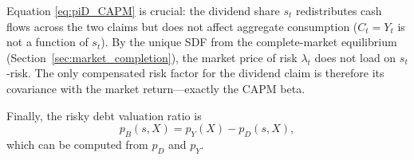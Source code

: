 \documentclass[11pt,english]{article}
\begin{document}
Equation \eqref{eq:piD_CAPM} is crucial: the dividend share $s_t$ redistributes cash flows across the two claims but does not affect aggregate consumption ($C_t=Y_t$ is not a function of $s_t$). By the unique SDF from the complete-market equilibrium (Section~\ref{sec:market_completion}), the market price of risk $\lambda_t$ does not load on $s_t$-risk. The only compensated risk factor for the dividend claim is therefore its covariance with the market return---exactly the CAPM beta.

Finally, the risky debt valuation ratio is
\begin{equation}\label{eq:pB_residual}
    p_B(s,X)=p_Y(X)-p_D(s,X),
\end{equation}
which can be computed from $p_D$ and $p_Y$.






\newpage
\singlespacing
%
\clearpage

\end{document}
